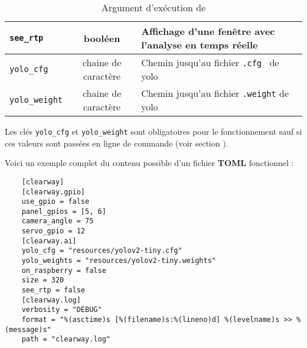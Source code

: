 \begin{table}[H]
\begin{tabularx}{\linewidth}{|l|c|X|}
        \texttt{see\_rtp}                                    & booléen                                             & Affichage d'une fenêtre avec l'analyse en temps réelle     \\ \hline
        \texttt{yolo\_cfg}                                   & chaine de caractère                                 & Chemin jusqu'au fichier \texttt{.cfg } de yolo             \\ \hline
        \texttt{yolo\_weight}                                & chaine de caractère                                 & Chemin jusqu'au fichier \texttt{.weight} de yolo           \\ \hline
    \end{tabularx}
    \caption{Argument d'exécution de }
\end{table}

Les clés \texttt{yolo\_cfg} et \texttt{yolo\_weight} sont obligatoires pour le fonctionnement sauf si ces valeurs sont
passées en ligne de commande (voir section ).\newline

Voici un exemple complet du contenu possible d'un fichier \textbf{TOML} fonctionnel :

\begin{verbatim}
    [clearway]
    [clearway.gpio]
    use_gpio = false
    panel_gpios = [5, 6]
    camera_angle = 75
    servo_gpio = 12
    [clearway.ai]
    yolo_cfg = "resources/yolov2-tiny.cfg"
    yolo_weights = "resources/yolov2-tiny.weights"
    on_raspberry = false
    size = 320
    see_rtp = false
    [clearway.log]
    verbosity = "DEBUG"
    format = "%(asctime)s [%(filename)s:%(lineno)d] %(levelname)s >> %(message)s"
    path = "clearway.log"
\end{verbatim}
